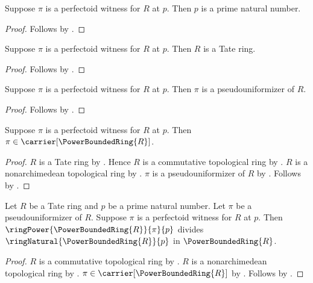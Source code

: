 \begin{proposition}\label{perfectoid_witness_prime}
    Suppose $\pi$ is a perfectoid witness for $R$ at $p$.
    Then $p$ is a prime natural number.
\end{proposition}
\begin{proof}
    Follows by .
\end{proof}

\begin{proposition}\label{perfectoid_witness_tate_ring}
    Suppose $\pi$ is a perfectoid witness for $R$ at $p$.
    Then $R$ is a Tate ring.
\end{proposition}
\begin{proof}
    Follows by .
\end{proof}

\begin{proposition}\label{perfectoid_witness_pseudouniformizer}
    Suppose $\pi$ is a perfectoid witness for $R$ at $p$.
    Then $\pi$ is a pseudouniformizer of $R$.
\end{proposition}
\begin{proof}
    Follows by .
\end{proof}

\begin{proposition}\label{perfectoid_witness_in_power_bounded_ring}
    Suppose $\pi$ is a perfectoid witness for $R$ at $p$.
    Then $\pi\in\carrier[\PowerBoundedRing{R}]$.
\end{proposition}
\begin{proof}
    $R$ is a Tate ring by .
    Hence $R$ is a commutative topological ring by
        .
    $R$ is a nonarchimedean topological ring by
        .
    $\pi$ is a pseudouniformizer of $R$ by
        .
    Follows by .
\end{proof}

\begin{proposition}\label{perfectoid_witness_divisibility}
    Let $R$ be a Tate ring and $p$ be a prime natural number.
    Let $\pi$ be a pseudouniformizer of $R$.
    Suppose $\pi$ is a perfectoid witness for $R$ at $p$.
    Then $\ringPower{\PowerBoundedRing{R}}{\pi}{p}$ divides
        $\ringNatural{\PowerBoundedRing{R}}{p}$ in
        $\PowerBoundedRing{R}$.
\end{proposition}
\begin{proof}
    $R$ is a commutative topological ring by
        .
    $R$ is a nonarchimedean topological ring by
        .
    $\pi\in\carrier[\PowerBoundedRing{R}]$ by
        .
    Follows by .
\end{proof}

